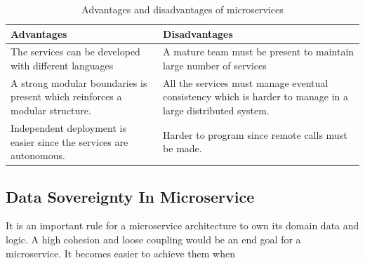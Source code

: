     \begin{table}[h!]
        \centering
        \begin{tabular}{|p{9cm}|p{7.5cm}|}
            \hline
                \textbf{Advantages}  & \textbf{Disadvantages}\\
            \hline
                The services can be developed with different languages & 
                A mature team must be present to maintain large number of services \\
            \hline
                A strong modular boundaries is present which reinforces a modular
                structure.
                & All the services must manage eventual consistency which is
                harder to manage in a large distributed system.\\
            \hline
                 Independent deployment is easier since the services are
                 autonomous. & Harder to program since remote calls must be made.\\
            \hline
        \end{tabular}
        \caption{Advantages and disadvantages of microservices \cite{FowlerMartin}}
        \label{table:Advantages and disadvantages of microservices}     
    \end{table}    

    \newpage
    \subsection{Data Sovereignty In Microservice}
    It is an important rule for a microservice architecture to own its domain data and 
    logic. A high cohesion and loose coupling would be an end goal for a microservice.
    It becomes easier to achieve them when 



